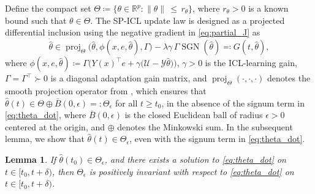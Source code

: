 \documentclass[conference]{ieeeconf}
\newcommand{\proj}{\operatorname{proj}}
\newcommand{\SGN}{\operatorname{SGN}}
\newtheorem{lemma}{Lemma}
\begin{document}
Define the compact set $\Theta \coloneqq \{\theta \in \mathbb{R}^p : \|\theta\| \, \leq \, r_{\theta}\}$, where $ r_{\theta}>0$ is a known bound such that $\theta \in \Theta$. The SP-ICL update law is designed as a projected differential inclusion using the negative gradient in \eqref{eq:partial_J} as
\begin{equation}\label{eq:theta_dot}
    \dot{\hat{\theta}} \in \proj_\Theta\Big(\hat{\theta}, \phi(x, e, \hat{\theta}), \Gamma\Big) - \lambda \gamma \, \Gamma \SGN(\hat{\theta}) \eqqcolon G(t, \hat{\theta}),
\end{equation}
where $\phi(x, e, \hat{\theta}) \coloneqq \Gamma\Big(Y(x)^\top e + \gamma \big(\mathcal{U} - \mathcal{Y}\hat{\theta}\big)\Big)$, $\gamma>0$ is the ICL-learning gain, $\Gamma = \Gamma^\top \succ 0$ is a diagonal adaptation gain matrix, and $\proj_{\Theta}(\cdot,\cdot,\cdot)$ denotes the smooth projection operator from \cite[Appendix E.1]{SCC.Krstic.Kanellakopoulos.ea1995}, which ensures that $\hat{\theta}(t) \in \Theta \oplus \bar{B}(0, \epsilon) =: \Theta_\epsilon$ for all $t \ge t_0$, in the absence of the signum term in \eqref{eq:theta_dot}, where $\bar{B}(0, \epsilon)$ is the closed Euclidean ball of radius $\epsilon > 0$ centered at the origin, and $\oplus$ denotes the Minkowski sum. In the subsequent lemma, we show that $\hat{\theta}(t) \in  \Theta_\epsilon$, even with the signum term in \eqref{eq:theta_dot}.
\begin{lemma}\label{lem:theta_bound}
 If $\hat{\theta}(t_{0}) \in \Theta_{\epsilon}$, and there exists a solution to \eqref{eq:theta_dot} on $t\in [t_0, t+\delta)$, then $\Theta_{\epsilon}$ is positively invariant with respect to \eqref{eq:theta_dot} on $t\in [t_0, t+\delta)$.
\end{lemma}
\end{document}
